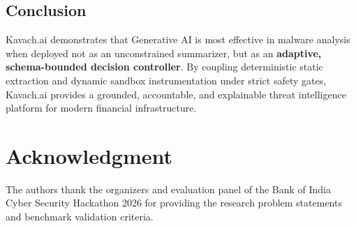 \documentclass[conference]{IEEEtran}
\begin{document}
\subsection{Conclusion}
Kavach.ai demonstrates that Generative AI is most effective in malware analysis when deployed not as an unconstrained summarizer, but as an \textbf{adaptive, schema-bounded decision controller}. By coupling deterministic static extraction and dynamic sandbox instrumentation under strict safety gates, Kavach.ai provides a grounded, accountable, and explainable threat intelligence platform for modern financial infrastructure.

\section*{Acknowledgment}
The authors thank the organizers and evaluation panel of the Bank of India Cyber Security Hackathon 2026 for providing the research problem statements and benchmark validation criteria.
\end{document}
